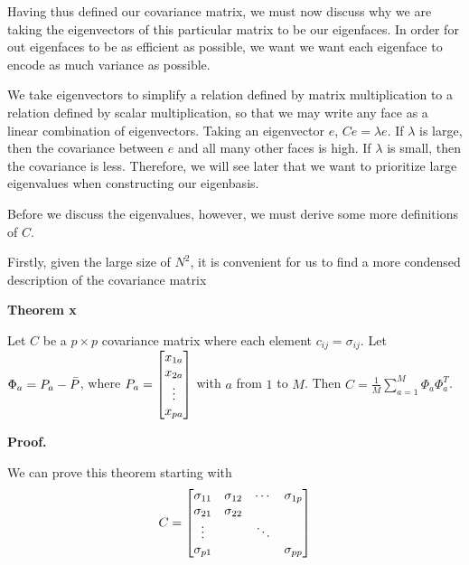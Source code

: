 \documentclass[12pt]{extarticle}
\begin{document}
        Having thus defined our covariance matrix, we must now discuss why we are taking the eigenvectors of this particular matrix to be our eigenfaces. In order for out eigenfaces to be as efficient as possible, we want we want each eigenface to encode as much variance as possible. 
        
        We take eigenvectors to simplify a relation defined by matrix multiplication to a relation defined by scalar multiplication, so that we may write any face as a linear combination of eigenvectors. Taking an eigenvector $e$, $C e = \lambda e$. If $\lambda$ is large, then the covariance between $e$ and all many other faces is high. If $\lambda$ is small, then the covariance is less. Therefore, we will see later that we want to prioritize large eigenvalues when constructing our eigenbasis. 
        
        Before we discuss the eigenvalues, however, we must derive some more definitions of $C$.
        
        Firstly, given the large size of $N^2$, it is convenient for us to find a more condensed description of the covariance matrix
        
        \textbf{Theorem x} 
        
        Let $C$ be a $p \times p$ covariance matrix where each element $c_{ij} = \sigma_{ij}$. Let $\Phi_a = P_a - \bar{P}$, where $P_a = \begin{bmatrix}
            x_{1a}\\
            x_{2a}\\
            \vdots \\
            x_{pa}
        \end{bmatrix}$ with $a$ from $1$ to $M$. Then $C = \frac{1}{M} \sum_{a=1}^M \Phi_a \Phi_a^T$.
        
        
        
        \textbf{Proof.} 
        
        We can prove this theorem starting with
            \[
                C = \begin{bmatrix}
                    \sigma_{11} & \sigma_{12} & \cdots & \sigma_{1p} \\
                    \sigma_{21} & \sigma_{22} &        &             \\
                    \vdots      &             & \ddots &             \\
                    \sigma_{p1} &             &        & \sigma_{pp}
                \end{bmatrix}
            \]
\end{document}
